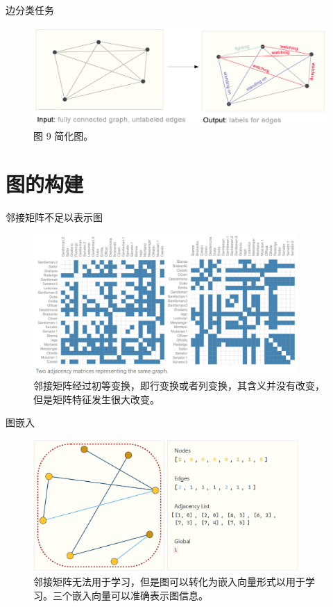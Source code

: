 \documentclass{beamer}
\begin{document}
\begin{frame}{边分类任务}
    \begin{figure}
        \includegraphics[width=\textwidth]{边分类2.jpg}
        \caption{图 9 简化图。}
    \end{figure}
\end{frame}

\section{图的构建}

\begin{frame}{邻接矩阵不足以表示图}
    \begin{figure}
        \includegraphics[width=0.9\textwidth]{邻接矩阵.jpg}
        \caption{邻接矩阵经过初等变换，即行变换或者列变换，其含义并没有改变，但是矩阵特征发生很大改变。}
    \end{figure}
\end{frame}

\begin{frame}{图嵌入}
    \begin{figure}
        \includegraphics[width=0.9\textwidth]{图嵌入.jpg}
        \caption{邻接矩阵无法用于学习，但是图可以转化为嵌入向量形式以用于学习。三个嵌入向量可以准确表示图信息。}
    \end{figure}
\end{frame}
\end{document}
